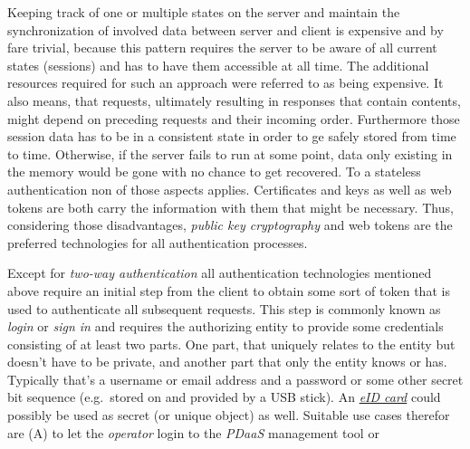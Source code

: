 \documentclass[12pt,english,a4paper,titlepage,cleardoublepage=empty,dottedtoc]{report}
\begin{document}
Keeping track of one or multiple states on the server and maintain the
synchronization of involved data between server and client is expensive
and by fare trivial, because this pattern requires the server to be
aware of all current states (sessions) and has to have them accessible
at all time. The additional resources required for such an approach were
referred to as being expensive. It also means, that requests, ultimately
resulting in responses that contain contents, might depend on preceding
requests and their incoming order. Furthermore those session data has to
be in a consistent state in order to ge safely stored from time to time.
Otherwise, if the server fails to run at some point, data only existing
in the memory would be gone with no chance to get recovered. To a
stateless authentication non of those aspects applies. Certificates and
keys as well as web tokens are both carry the information with them that
might be necessary. Thus, considering those disadvantages, \emph{public
key cryptography} and web tokens are the preferred technologies for all
authentication processes.

Except for \emph{two-way authentication} all authentication technologies
mentioned above require an initial step from the client to obtain some
sort of token that is used to authenticate all subsequent requests. This
step is commonly known as \emph{login} or \emph{sign in} and requires
the authorizing entity to provide some credentials consisting of at
least two parts. One part, that uniquely relates to the entity but
doesn't have to be private, and another part that only the entity knows
or has. Typically that's a username or email address and a password or
some other secret bit sequence (e.g.~stored on and provided by a USB
stick). An \emph{\protect\hyperlink{def--eid-card}{eID card}} could
possibly be used as secret (or unique object) as well. Suitable use
cases therefor are (A) to let the \emph{operator} login to the
\emph{PDaaS} management tool or
\end{document}
